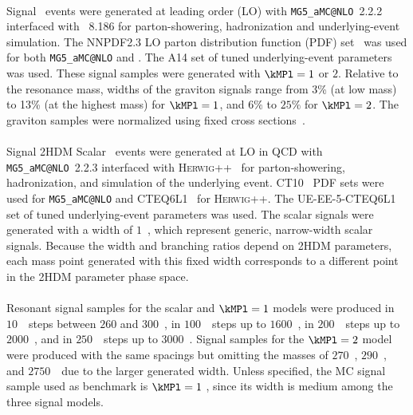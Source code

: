 \paragraph{}
Signal \Gtohhb\ events were generated at leading order (LO) with \texttt{MG5\_\-aMC\-@NLO}~2.2.2~\cite{MGaMCatNLO} interfaced with \pythia~8.186 for parton-showering, hadronization and underlying-event simulation. 
The NNPDF2.3 LO parton distribution function (PDF) set~\cite{Ball:2012cx} was used for both \texttt{MG5\_\-aMC\-@NLO} and \pythia. 
The A14 set of tuned underlying-event parameters was used. 
These signal samples were generated with $\kMPl = 1$ or $2$.
Relative to the resonance mass, widths of the graviton signals range from 3\% (at low mass) to 13\% (at the highest mass) for $\kMPl=1$, and $6\%$ to $25\%$ for $\kMPl=2$.
The graviton samples were normalized using fixed cross sections~\cite{carvalho}.

\paragraph{}
Signal 2HDM Scalar \tohhb\ events were generated at LO in QCD with \texttt{MG5\_aMC@NLO}~2.2.3 interfaced with \textsc{Herwig++}~\cite{Bahr:2008pv} for parton-showering, hadronization, and simulation of the underlying event. CT10~\cite{Lai:2010vv} PDF sets were used for \texttt{MG5\_aMC@NLO} and CTEQ6L1~\cite{cteq6l1} for \textsc{Herwig++}.
The UE-EE-5-CTEQ6L1 set of tuned underlying-event parameters \cite{Seymour:2013qka} was used. 
The scalar signals were generated with a width of $1$~\GeV, which represent generic, narrow-width scalar signals. 
Because the width and branching ratios depend on 2HDM parameters, each mass point generated with this fixed width corresponds to a different point in the 2HDM parameter phase space.

\paragraph{}
Resonant signal samples for the scalar and $\kMPl=1$ models were produced in $10$~\GeV\ steps between $260$ and $300$~\GeV, in $100$~\GeV\ steps up to $1600$~\GeV, in $200$~\GeV\ steps up to $2000$~\GeV, and in $250$~\GeV\ steps up to $3000$~\GeV. Signal samples for the $\kMPl=2$ model were produced with the same spacings but omitting the masses of $270$~\GeV, $290$~\GeV, and $2750$~\GeV\ due to the larger generated width. Unless specified, the MC signal sample used as benchmark is $\kMPl=1$ \Grav, since its width is medium among the three signal models.

